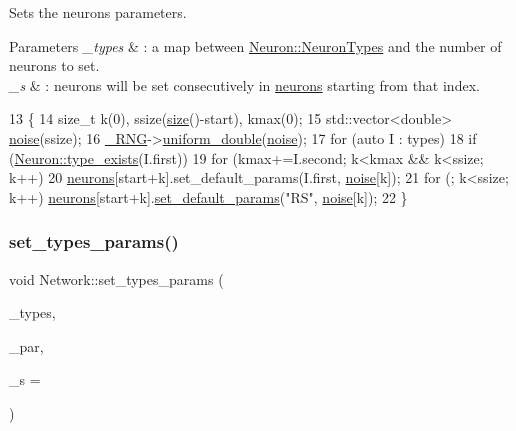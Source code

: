 Sets the neurons parameters. 
\begin{DoxyParams}{Parameters}
{\em \+\_\+types} & \+: a map between \hyperlink{classNeuron_ab4b47274e756b72923d2f8a9a5037d23}{Neuron\+::\+Neuron\+Types} and the number of neurons to set. \\
\hline
{\em \+\_\+s} & \+: neurons will be set consecutively in \hyperlink{classNetwork_a1b7832bc2c7b8855cdc3b2d6329eff9d}{neurons} starting from that index. \\
\hline
\end{DoxyParams}

\begin{DoxyCode}
13                                                      \{
14     \textcolor{keywordtype}{size\_t} k(0), ssize(\hyperlink{classNetwork_a41c54d12d861883170b5c5abca3a7bc8}{size}()-start), kmax(0);
15     std::vector<double> \hyperlink{test__main_8cpp_aedb3acb007b8cca8efc63eed08f45705}{noise}(ssize);
16     \hyperlink{main_8cpp_ad20d7a8b3940b60cfd9cd7188fb503ea}{\_RNG}->\hyperlink{classRandomNumbers_ae226c129494f9055ac37ed1af943d010}{uniform\_double}(\hyperlink{test__main_8cpp_aedb3acb007b8cca8efc63eed08f45705}{noise});
17     \textcolor{keywordflow}{for} (\textcolor{keyword}{auto} I : types) 
18         \textcolor{keywordflow}{if} (\hyperlink{classNeuron_a3a80c93e7cf5214b5e1a9925742bbe8e}{Neuron::type\_exists}(I.first)) 
19             \textcolor{keywordflow}{for} (kmax+=I.second; k<kmax && k<ssize; k++) 
20                 \hyperlink{classNetwork_a1b7832bc2c7b8855cdc3b2d6329eff9d}{neurons}[start+k].set\_default\_params(I.first, \hyperlink{test__main_8cpp_aedb3acb007b8cca8efc63eed08f45705}{noise}[k]);
21     \textcolor{keywordflow}{for} (; k<ssize; k++) \hyperlink{classNetwork_a1b7832bc2c7b8855cdc3b2d6329eff9d}{neurons}[start+k].\hyperlink{classNetwork_ad1d20020028425cfab199da1942172c9}{set\_default\_params}(\textcolor{stringliteral}{"RS"}, 
      \hyperlink{test__main_8cpp_aedb3acb007b8cca8efc63eed08f45705}{noise}[k]);
22 \}
\end{DoxyCode}
\mbox{\label{classNetwork_a40daf6578a6146f4c339f0efffd5070d}} 
\subsubsection{\texorpdfstring{set\+\_\+types\+\_\+params()}{set\_types\_params()}}
{\footnotesize\ttfamily void Network\+::set\+\_\+types\+\_\+params (\begin{DoxyParamCaption}\item[{const std\+::vector$<$ std\+::string $>$ \&}]{\+\_\+types,  }\item[{const std\+::vector$<$ \hyperlink{structNeuronParams}{Neuron\+Params} $>$ \&}]{\+\_\+par,  }\item[{const size\+\_\+t}]{\+\_\+s = {} }\end{DoxyParamCaption})}

